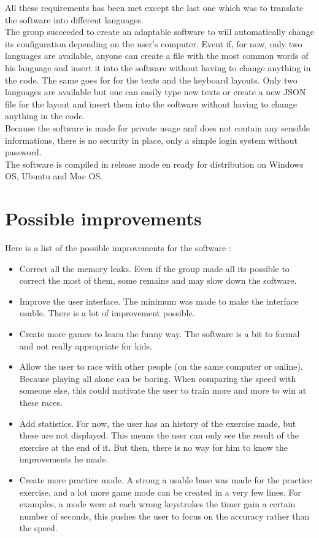 All these requirements has been met except the last one which was to translate the software into different languages.\\
The group succeeded to create an adaptable software to will automatically change its configuration depending on the user's computer. Event if, for now, only two languages are available, anyone can create a file with the most common words of his language and insert it into the software without having to change anything in the code. The same goes for for the texts and the keyboard layouts. Only two languages are available but one can easily type new texts or create a new JSON file for the layout and insert them into the software without having to change anything in the code.\\
Because the software is made for private usage and does not contain any sensible informations, there is no security in place, only a simple login system without password.\\
The software is compiled in release mode en ready for distribution on Windows OS, Ubuntu and Mac OS.


\chapter{Possible improvements}
Here is a list of the possible improvements for the software :
\begin{itemize}
	\item Correct all the memory leaks. Even if the group made all its possible to correct the most of them, some remains and may slow down the software.
	\item Improve the user interface. The minimum was made to make the interface usable. There is a lot of improvement possible.
	\item Create more games to learn the funny way. The software is a bit to formal and not really appropriate for kids.
	\item Allow the user to race with other people (on the same computer or online). Because playing all alone can be boring. When comparing the speed with someone else, this could motivate the user to train more and more to win at these races.
	\item Add statistics. For now, the user has an history of the exercise made, but these are not displayed. This means the user can only see the result of the exercise at the end of it. But then, there is no way for him to know the improvements he made.
	\item Create more practice mode. A strong a usable base was made for the practice exercise, and a lot more game mode can be created in a very few lines. For examples, a mode were at each wrong keystrokes the timer gain a certain number of seconds, this pushes the user to focus on the accuracy rather than the speed.
\end{itemize}


